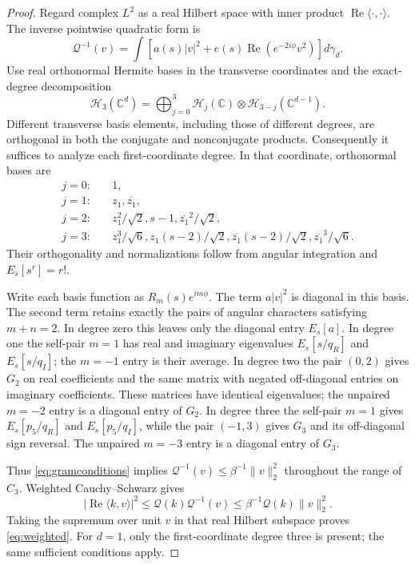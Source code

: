 \documentclass[11pt]{article}
\theoremstyle{remark}\newtheorem{remark}[theorem]{Remark}
\newcommand{\C}{\mathbb C}
\newcommand{\ip}[2]{\langle #1,#2\rangle}
\newcommand{\norm}[1]{\lVert #1\rVert}
\DeclareMathOperator{\Rea}{Re}
\begin{document}
\begin{proof}
Regard complex \(L^2\) as a real Hilbert space with inner product
\(\Rea\ip\cdot\cdot\). The inverse pointwise quadratic form is
\[
\mathcal Q^{-1}(v)
=\int\left[a(s)|v|^2+e(s)\Rea(e^{-2i\phi}v^2)\right]d\gamma_d.
\]
Use real orthonormal Hermite bases in the transverse coordinates and
the exact-degree decomposition
\[
\mathcal H_3(\C^d)=\bigoplus_{j=0}^3
\mathcal H_j(\C)\otimes\mathcal H_{3-j}(\C^{d-1}).
\]
Different transverse basis elements, including those of different
degrees, are orthogonal in both the conjugate and nonconjugate products.
Consequently it suffices to analyze each first-coordinate degree.
In that coordinate, orthonormal bases are
\begin{align*}
 j=0:&\quad 1,\\
 j=1:&\quad z_1,\overline{z_1},\\
 j=2:&\quad z_1^2/\sqrt2,
 s-1,\overline{z_1}^2/\sqrt2,\\
 j=3:&\quad z_1^3/\sqrt6,
 z_1(s-2)/\sqrt2,\overline{z_1}(s-2)/\sqrt2,
 \overline{z_1}^3/\sqrt6.
\end{align*}
Their orthogonality and normalizations follow from angular integration
and \(E_s[s^r]=r!\).

Write each basis function as \(R_m(s)e^{im\phi}\). The term
\(a|v|^2\) is diagonal in this basis. The second term retains exactly
the pairs of angular characters satisfying \(m+n=2\). In degree
zero this leaves only the diagonal entry \(E_s[a]\). In degree one
the self-pair \(m=1\) has real and imaginary eigenvalues
\(E_s[s/q_R]\) and \(E_s[s/q_I]\); the \(m=-1\) entry is their
average. In degree two the pair \((0,2)\) gives \(G_2\) on real
coefficients and the same matrix with negated off-diagonal entries on
imaginary coefficients. These matrices have identical eigenvalues;
the unpaired \(m=-2\) entry is a diagonal entry of \(G_2\).
In degree three the self-pair \(m=1\) gives
\(E_s[p_5/q_R]\) and \(E_s[p_5/q_I]\), while the pair \((-1,3)\)
gives \(G_3\) and its off-diagonal sign reversal. The unpaired
\(m=-3\) entry is a diagonal entry of \(G_3\).

Thus \eqref{eq:gramconditions} implies
\(\mathcal Q^{-1}(v)\le\beta^{-1}\norm v_2^2\) throughout the
range of \(C_3\). Weighted Cauchy--Schwarz gives
\[
|\Rea\ip{k}{v}|^2\le\mathcal Q(k)\mathcal Q^{-1}(v)
\le\beta^{-1}\mathcal Q(k)\norm v_2^2.
\]
Taking the supremum over unit \(v\) in that real Hilbert subspace
proves \eqref{eq:weighted}. For \(d=1\), only the first-coordinate
degree three is present; the same sufficient conditions apply.
\end{proof}
\end{document}
